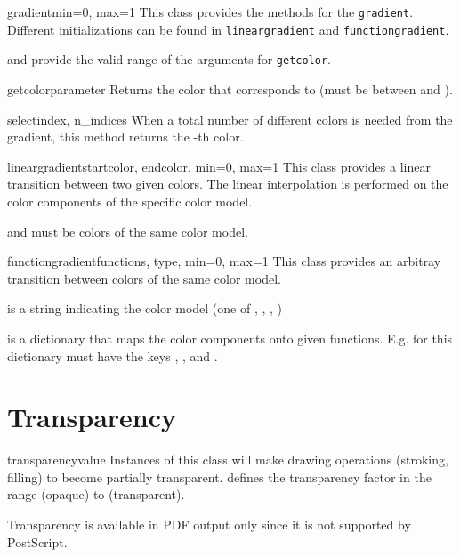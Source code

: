 \begin{classdesc}{gradient}{min=0, max=1}
  This class provides the methods for the \verb|gradient|. Different
  initializations can be found in \verb|lineargradient| and
  \verb|functiongradient|.

   and  provide the valid range of the arguments for
  \verb|getcolor|.

  \begin{funcdesc}{getcolor}{parameter}
    Returns the color that corresponds to  (must be between
     and ).
  \end{funcdesc}

  \begin{funcdesc}{select}{index, n\_indices}
    When a total number of  different colors is needed from the
    gradient, this method returns the -th color.
  \end{funcdesc}

\end{classdesc}


\begin{classdesc}{lineargradient}{startcolor, endcolor, min=0, max=1}
  This class provides a linear transition between two given colors. The linear
  interpolation is performed on the color components of the specific color
  model.

   and  must be colors of the same color model.
\end{classdesc}

\begin{classdesc}{functiongradient}{functions, type, min=0, max=1}
  This class provides an arbitray transition between colors of the same
  color model.

   is a string indicating the color model (one of ,
  , , )

   is a dictionary that maps the color components onto given
  functions. E.g. for  this dictionary must have the keys
  , , and .

\end{classdesc}

\section{Transparency}

\begin{classdesc}{transparency}{value}
  Instances of this class will make drawing operations (stroking,
  filling) to become partially transparent.  defines the
  transparency factor in the range  (opaque) to 
  (transparent).

  Transparency is available in PDF output only since it is not
  supported by PostScript.
\end{classdesc}

